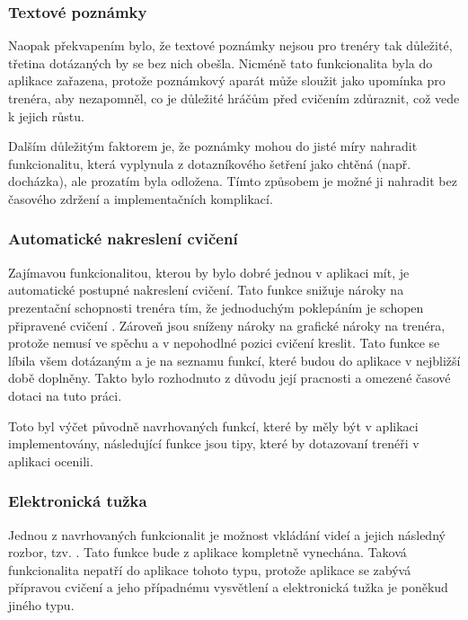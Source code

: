 \documentclass[thesis=B,czech]{FITthesis}[2012/06/26]
\begin{document}
\subsubsection{Textové poznámky}

	Naopak překvapením bylo, že textové poznámky nejsou pro trenéry tak důležité, třetina dotázaných by se bez nich obešla. Nicméně tato funkcionalita byla do aplikace zařazena, protože poznámkový aparát může sloužit jako upomínka pro trenéra, aby nezapomněl, co je důležité hráčům před cvičením zdůraznit, což vede k jejich růstu.

	Dalším důležitým faktorem je, že poznámky mohou do jisté míry nahradit funkcionalitu, která vyplynula z dotazníkového šetření jako chtěná (např. docházka), ale prozatím byla odložena. Tímto způsobem je možné ji nahradit bez časového zdržení a  implementačních komplikací.

\subsubsection{Automatické nakreslení cvičení}

	Zajímavou funkcionalitou, kterou by bylo dobré jednou v aplikaci mít, je automatické postupné nakreslení cvičení. Tato funkce snižuje nároky na prezentační schopnosti trenéra tím, že jednoduchým poklepáním je schopen připravené cvičení . Zároveň jsou sníženy nároky na grafické nároky na trenéra, protože nemusí ve spěchu a v nepohodlné pozici cvičení kreslit. Tato funkce se líbila všem dotázaným a je na seznamu funkcí, které budou do aplikace v nejbližší době doplněny. Takto bylo rozhodnuto z důvodu její pracnosti a omezené časové dotaci na tuto práci.

	Toto byl výčet původně navrhovaných funkcí, které by měly být v aplikaci implementovány, následující funkce jsou tipy, které by dotazovaní trenéři v aplikaci ocenili.

\subsubsection{Elektronická tužka}

	Jednou z navrhovaných funkcionalit je možnost vkládání videí a jejich následný rozbor, tzv. . Tato funkce bude z aplikace kompletně vynechána. Taková funkcionalita nepatří do aplikace tohoto typu, protože aplikace se zabývá přípravou cvičení a jeho případnému vysvětlení a elektronická tužka je poněkud jiného typu.
\end{document}
